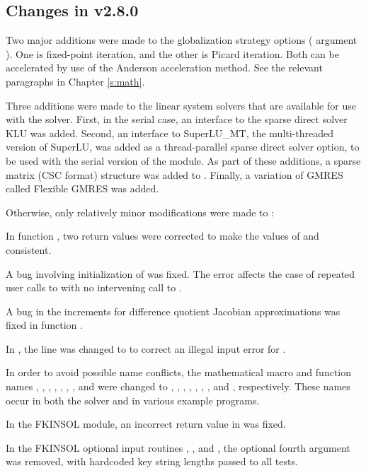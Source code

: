 \subsection*{Changes in v2.8.0}

Two major additions were made to the globalization strategy options
( argument ).  One is fixed-point iteration,
and the other is Picard iteration.  Both can be accelerated by use
of the Anderson acceleration method.  See the relevant paragraphs in
Chapter \ref{s:math}.

Three additions were made to the linear system solvers that are
available for use with the {\kinsol} solver.  First, in the serial case,
an interface to the sparse direct solver KLU was added.
Second, an interface to SuperLU\_MT, the multi-threaded version of
SuperLU, was added as a thread-parallel sparse direct solver option,
to be used with the serial version of the {\nvector} module.
As part of these additions, a sparse matrix (CSC format) structure
was added to {\kinsol}.  Finally, a variation of GMRES called
Flexible GMRES was added.

Otherwise, only relatively minor modifications were made to {\kinsol}:

In function , two return values were corrected to make the values
of  and  consistent.

A bug involving initialization of  was fixed.
The error affects the case of repeated user calls to  with no
intervening call to .

A bug in the increments for difference quotient Jacobian approximations
was fixed in function .

In , the line  was changed to
 to correct an illegal input error for .

In order to avoid possible name conflicts, the mathematical macro
and function names , , , , ,
, , and  were changed to
, , , , ,
, , and , respectively.
These names occur in both the solver and in various example programs.

In the FKINSOL module, an incorrect return value  in 
was fixed.

In the FKINSOL optional input routines , , and
, the optional fourth argument  was removed,
with hardcoded key string lengths passed to all  tests.


